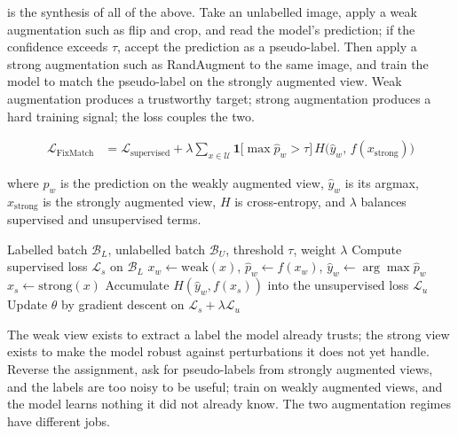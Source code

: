 \vspace{1.5em}

 is the synthesis of all of the above\cite{Sohn2020FixMatch}.
Take an unlabelled image, apply a weak augmentation such as flip and crop, and read the model's prediction; if the confidence exceeds $\tau$, accept the prediction as a pseudo-label.
Then apply a strong augmentation such as RandAugment to the same image, and train the model to match the pseudo-label on the strongly augmented view.
Weak augmentation produces a trustworthy target; strong augmentation produces a hard training signal; the loss couples the two.

\begin{align*}
    \mathcal{L}_{\text{FixMatch}} &= \mathcal{L}_{\text{supervised}} + \lambda \sum_{x \in \mathcal{U}} \mathbf{1}\!\bigl[\max \hat{p}_w > \tau\bigr]\, H\bigl(\hat{y}_w,\, f(x_{\text{strong}})\bigr)
\end{align*}

where $\hat{p}_w$ is the prediction on the weakly augmented view, $\hat{y}_w$ is its argmax, $x_{\text{strong}}$ is the strongly augmented view, $H$ is cross-entropy, and $\lambda$ balances supervised and unsupervised terms.

\begin{algorithm}[H]
\caption{FixMatch}
\begin{algorithmic}[1]
\Require Labelled batch $\mathcal{B}_L$, unlabelled batch $\mathcal{B}_U$, threshold $\tau$, weight $\lambda$
\State Compute supervised loss $\mathcal{L}_s$ on $\mathcal{B}_L$
    \State $x_w \gets \mathrm{weak}(x)$, $\hat{p}_w \gets f(x_w)$, $\hat{y}_w \gets \arg\max \hat{p}_w$
        \State $x_s \gets \mathrm{strong}(x)$
        \State Accumulate $H(\hat{y}_w, f(x_s))$ into the unsupervised loss $\mathcal{L}_u$
    \EndIf
\EndFor
\State Update $\theta$ by gradient descent on $\mathcal{L}_s + \lambda \mathcal{L}_u$
\end{algorithmic}
\end{algorithm}

The weak view exists to extract a label the model already trusts; the strong view exists to make the model robust against perturbations it does not yet handle.
Reverse the assignment, ask for pseudo-labels from strongly augmented views, and the labels are too noisy to be useful; train on weakly augmented views, and the model learns nothing it did not already know.
The two augmentation regimes have different jobs.

